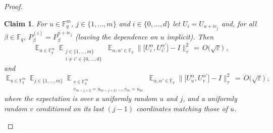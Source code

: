 \documentclass[11pt]{article}
\newtheorem{claim}[theorem]{Claim}
\theoremstyle{definition}
\newcommand{\Id}{\ensuremath{I}}
\DeclareMathOperator*{\Expectation}{\mathbb{E}}
\newcommand{\Es}[1]{\Expectation_{#1}}
\newcommand{\F}{\ensuremath{\mathbb{F}}}
\newcommand{\eps}{\varepsilon}
\DeclareMathOperator{\tr}{tr}
\begin{document}
\begin{proof}

\begin{claim}\label{claim:z2-stab-2b}
For $u\in \F_q^m$, $j\in\{1,\ldots,m\}$ and $i\in \{0,\ldots,d\}$ let $U_{i} = U_{u+ie_j}$ and, for all $\beta\in\F_q$, $P^{(i)}_\beta = P^{u+ie_j}_\beta$ (leaving the dependence on $u$ implicit). Then 
\begin{equation}\label{eq:z2-stab-2b-0a}
\Es{u\in \F_q^m} \Es{\substack{j\in\{1,\ldots,m\}\\i\neq i' \in \{0,\ldots,d\}}}\Es{\alpha,\alpha'\in \F_q} \big\| \big[ U_i^\alpha, U_{i'}^{\alpha'}\big]-\Id\big\|_\tau^2\,=\, O\big(\sqrt{\eps}\big)\;, 
\end{equation}
and
\begin{equation}\label{eq:z2-stab-2b-0b}
 \Es{u\in \F_q^m} \Es{j\in\{1,\ldots,m\}} \Es{\substack{v\in \F_q^m \\v_{m-j+2}=u_{m-j+2},\ldots,v_m=u_m}}\Es{\alpha,\alpha'\in \F_q} \big\| \big[ U_u^\alpha, U_{v}^{\alpha'}\big]-\Id\big\|_\tau^2\,=\, O\big(\sqrt{\eps}\big)\;,
\end{equation}
where the expectation is over a uniformly random $u$ and $j$, and a uniformly random $v$ conditioned on its last $(j-1)$ coordinates matching those of $u$. 
\end{claim}


\end{proof}
\end{document}
